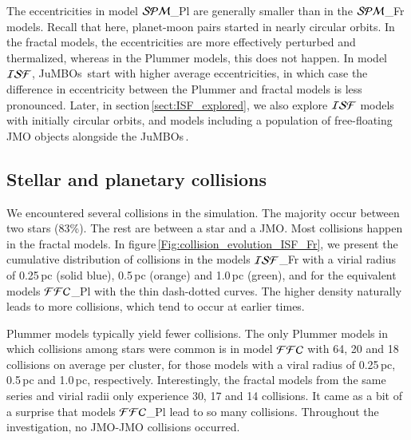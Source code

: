 \documentclass[submission,phys]{lib/SciPost}
\newcommand{\jumbos}{\mbox{JuMBOs}}
\begin{document}
The eccentricities in model ${\cal SPM}$\_Pl are generally smaller
than in the ${\cal SPM}$\_Fr models. Recall that here, planet-moon
pairs started in nearly circular orbits.  In the fractal models, the
eccentricities are more effectively perturbed and thermalized, whereas
in the Plummer models, this does not happen.  In model ${\cal ISF}$,
\jumbos\, start with higher average eccentricities, in which case the
difference in eccentricity between the Plummer and fractal models is
less pronounced. Later, in section\,\ref{sect:ISF_explored}, we also
explore ${\cal ISF}$ models with initially circular orbits, and models
including a population of free-floating JMO objects alongside the \jumbos\,.

\subsection{Stellar and planetary collisions}\label{Sect:collisions}

We encountered several collisions in the simulation. The
majority occur between two stars (83\%). The rest are between a star
and a JMO. Most collisions happen in the fractal models.
In figure\,\ref{Fig:collision_evolution_ISF_Fr}, we present the
cumulative distribution of collisions in the models ${\cal ISF}$\_Fr
with a virial radius of 0.25\,pc (solid blue), 0.5\,pc (orange) and
1.0\,pc (green), and for the equivalent models ${\cal FFC}$\_Pl with the
thin dash-dotted curves.  The higher density naturally leads to more
collisions, which tend to occur at earlier times.  

Plummer models typically yield fewer collisions.  The only Plummer
models in which collisions among stars were common is in model ${\cal
  FFC}$ with 64, 20 and 18 collisions on average per cluster, for
those models with a viral radius of 0.25\,pc, 0.5\,pc and 1.0\,pc,
respectively.  Interestingly, the fractal models from the same
series and virial radii only experience 30, 17 and 14 collisions.  
It came as a bit of a surprise that models ${\cal FFC}$\_Pl
lead to so many collisions. Throughout the investigation, no JMO-JMO 
collisions occurred.
\end{document}

